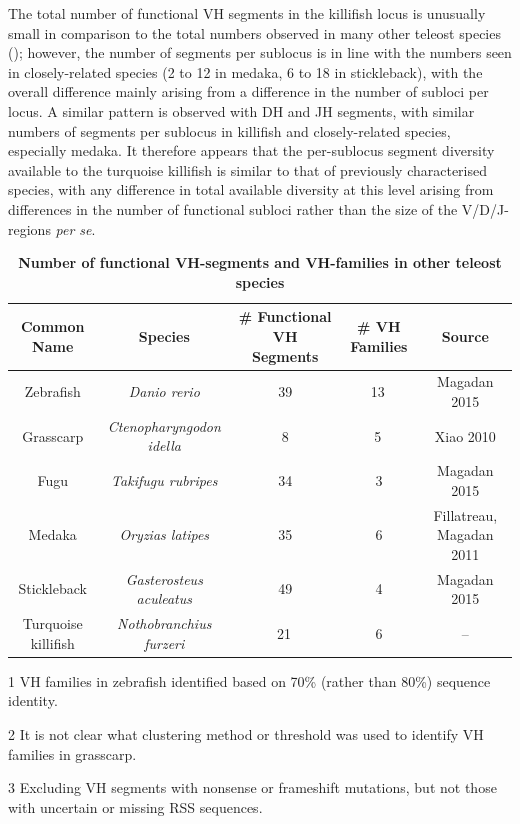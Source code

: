 	The total number of functional VH segments in the killifish locus is unusually small in comparison to the total numbers observed in many other teleost species (); however, the number of segments per sublocus is in line with the numbers seen in closely-related species (2 to 12 in medaka, 6 to 18 in stickleback), with the overall difference mainly arising from a difference in the number of subloci per locus. A similar pattern is observed with DH and JH segments, with similar numbers of segments per sublocus in killifish and closely-related species, especially medaka. It therefore appears that the per-sublocus segment diversity available to the turquoise killifish is similar to that of previously characterised species, with any difference in total available diversity at this level arising from differences in the number of functional subloci rather than the size of the V/D/J-regions \textit{per se}. %
	
	\begin{table}
	\begin{threeparttable}
	\caption{\textbf{Number of functional VH-segments and VH-families in other teleost species}}
	\label{tab:teleost-vh-counts}
	\begin{tabular}{ccccc}\toprule
	\textbf{Common Name} & \textbf{Species} & \textbf{\# Functional VH Segments} & \textbf{\# VH Families} & \textbf{Source}\\\midrule
	Zebrafish & \textit{Danio rerio} & 39 & 13\,\tnote{1} & Magadan 2015 \\
	Grasscarp & \textit{Ctenopharyngodon idella} & 8 & 5\,\tnote{2} & Xiao 2010 \\
	Fugu & \textit{Takifugu rubripes} & 34 & 3 & Magadan 2015 \\
	Medaka & \textit{Oryzias latipes} & 35 & 6 & Fillatreau, Magadan 2011 \\
	Stickleback & \textit{Gasterosteus aculeatus} & 49 & 4 & Magadan 2015 \\
	Turquoise killifish & \textit{Nothobranchius furzeri} & 21\,\tnote{3} & 6 & -- \\
	\bottomrule\end{tabular}
	\begin{tablenotes}
	\item[1] VH families in zebrafish identified based on 70\% (rather than 80\%) sequence identity.
	\item[2] It is not clear what clustering method or threshold was used to identify VH families in grasscarp.
	\item[3] Excluding VH segments with nonsense or frameshift mutations, but not those with uncertain or missing RSS sequences.
	\end{tablenotes}
	\end{threeparttable}
	\end{table} %
	
